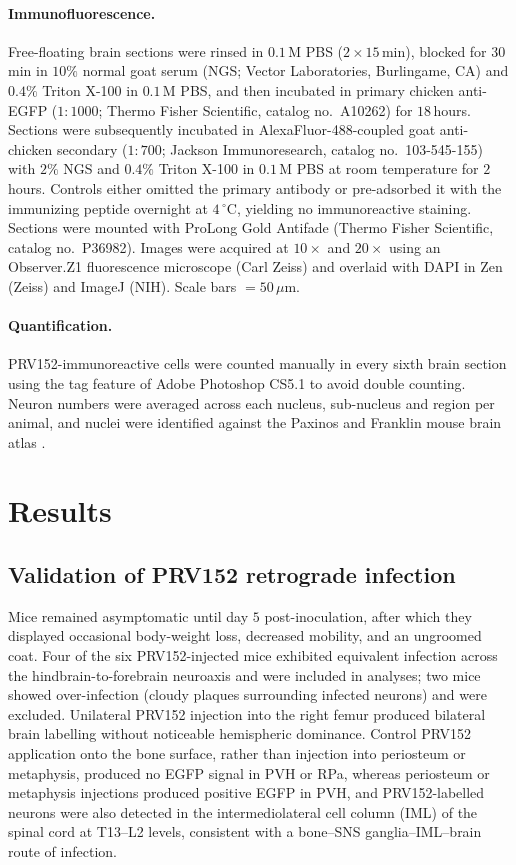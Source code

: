 \documentclass[11pt]{article}
\begin{document}
\paragraph{Immunofluorescence.} Free-floating brain sections were rinsed in $0.1$\,M PBS ($2 \times 15$\,min), blocked for $30$\,min in $10\%$ normal goat serum (NGS; Vector Laboratories, Burlingame, CA) and $0.4\%$ Triton X-100 in $0.1$\,M PBS, and then incubated in primary chicken anti-EGFP ($1{:}1000$; Thermo Fisher Scientific, catalog no.\ A10262) for $18$\,hours. Sections were subsequently incubated in AlexaFluor-488-coupled goat anti-chicken secondary ($1{:}700$; Jackson Immunoresearch, catalog no.\ 103-545-155) with $2\%$ NGS and $0.4\%$ Triton X-100 in $0.1$\,M PBS at room temperature for $2$\,hours. Controls either omitted the primary antibody or pre-adsorbed it with the immunizing peptide overnight at $4\,^\circ\mathrm{C}$, yielding no immunoreactive staining. Sections were mounted with ProLong Gold Antifade (Thermo Fisher Scientific, catalog no.\ P36982). Images were acquired at $10\times$ and $20\times$ using an Observer.Z1 fluorescence microscope (Carl Zeiss) and overlaid with DAPI in Zen (Zeiss) and ImageJ (NIH). Scale bars $= 50\,\mu\mathrm{m}$.

\paragraph{Quantification.} PRV152-immunoreactive cells were counted manually in every sixth brain section using the tag feature of Adobe Photoshop CS5.1 to avoid double counting. Neuron numbers were averaged across each nucleus, sub-nucleus and region per animal, and nuclei were identified against the Paxinos and Franklin mouse brain atlas \cite{paxinos2007}.

\section{Results}

\subsection{Validation of PRV152 retrograde infection}
Mice remained asymptomatic until day $5$ post-inoculation, after which they displayed occasional body-weight loss, decreased mobility, and an ungroomed coat. Four of the six PRV152-injected mice exhibited equivalent infection across the hindbrain-to-forebrain neuroaxis and were included in analyses; two mice showed over-infection (cloudy plaques surrounding infected neurons) and were excluded. Unilateral PRV152 injection into the right femur produced bilateral brain labelling without noticeable hemispheric dominance. Control PRV152 application onto the bone surface, rather than injection into periosteum or metaphysis, produced no EGFP signal in PVH or RPa, whereas periosteum or metaphysis injections produced positive EGFP in PVH, and PRV152-labelled neurons were also detected in the intermediolateral cell column (IML) of the spinal cord at T13--L2 levels, consistent with a bone--SNS ganglia--IML--brain route of infection.
\end{document}
